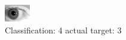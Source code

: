 \begin{figure}[h!]
\begin{center}
\includegraphics[width=0.60\columnwidth]{figures/ID186_class_4_target_3.png}
\end{center}
\caption{ Classification: 4 actual target: 3}
\label{fig:ID186_class_4_target_3}
\end{figure}
